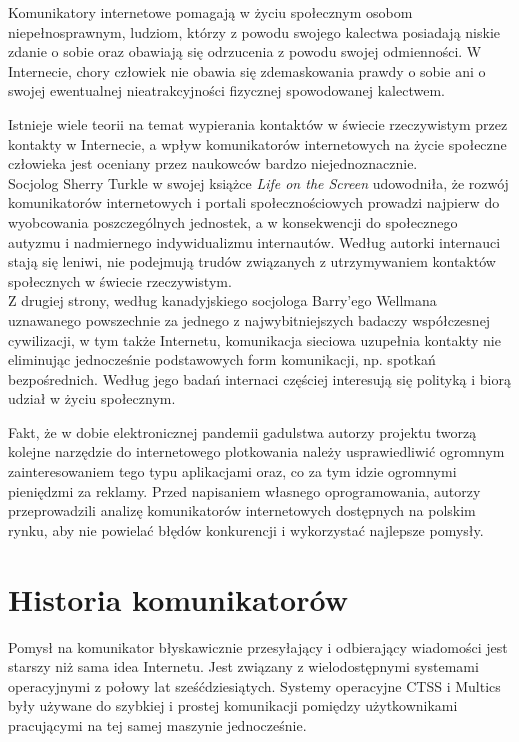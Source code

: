 \documentclass[a4paper,12pt]{article}
\begin{document}
\par Komunikatory internetowe pomagają w życiu społecznym osobom niepełnosprawnym, ludziom, którzy z powodu swojego kalectwa posiadają niskie zdanie o sobie oraz obawiają się odrzucenia z powodu swojej odmienności. W Internecie, chory człowiek nie obawia się zdemaskowania prawdy o sobie ani o swojej ewentualnej nieatrakcyjności fizycznej spowodowanej kalectwem.

\par Istnieje wiele teorii na temat wypierania kontaktów w świecie rzeczywistym przez kontakty w Internecie, a wpływ komunikatorów internetowych na życie społeczne człowieka jest oceniany przez naukowców bardzo niejednoznacznie.\\
Socjolog Sherry Turkle w swojej książce \emph{Life on the Screen} udowodniła, że rozwój komunikatorów internetowych i portali społecznościowych prowadzi najpierw do wyobcowania poszczególnych jednostek, a w konsekwencji do społecznego autyzmu i nadmiernego indywidualizmu internautów.
Według autorki internauci stają się leniwi, nie podejmują trudów związanych z utrzymywaniem kontaktów społecznych w świecie rzeczywistym.\\
Z drugiej strony, według kanadyjskiego socjologa Barry'ego Wellmana uznawanego powszechnie za jednego z najwybitniejszych badaczy współczesnej cywilizacji, w tym także Internetu, komunikacja sieciowa uzupełnia kontakty nie eliminując jednocześnie podstawowych form komunikacji, np. spotkań bezpośrednich. Według jego badań internaci częściej interesują się polityką i biorą udział w życiu społecznym.

\par Fakt, że w dobie elektronicznej pandemii gadulstwa autorzy projektu tworzą kolejne narzędzie do internetowego plotkowania należy usprawiedliwić ogromnym zainteresowaniem tego typu aplikacjami oraz, co za tym idzie ogromnymi pieniędzmi za reklamy. Przed napisaniem własnego oprogramowania, autorzy przeprowadzili analizę komunikatorów internetowych dostępnych na polskim rynku, aby nie powielać błędów konkurencji i wykorzystać najlepsze pomysły.

\section[Historia komunikatorów]{Historia komunikatorów}
Pomysł na komunikator błyskawicznie przesyłający i odbierający wiadomości jest starszy niż sama idea Internetu. Jest związany z wielodostępnymi systemami operacyjnymi z połowy lat sześćdziesiątych. Systemy operacyjne CTSS i Multics były używane do szybkiej i prostej komunikacji pomiędzy użytkownikami pracującymi na tej samej maszynie jednocześnie.
\end{document}

